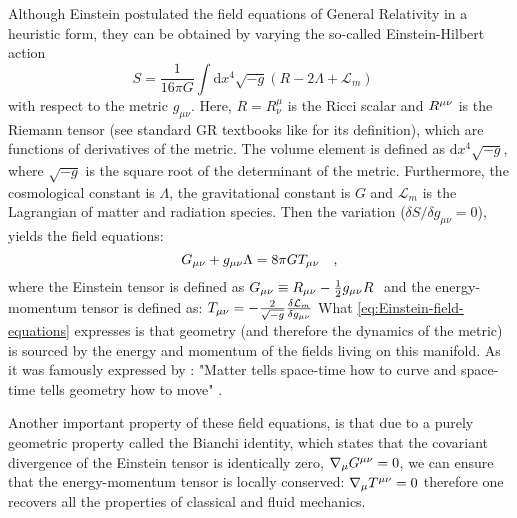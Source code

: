 Although Einstein postulated the field equations of General Relativity in a heuristic
form, they can be obtained by varying the so-called Einstein-Hilbert action
\begin{equation}\label{eq:Einstein-Hilbert action}
S = \frac{1}{16 \pi G} \int \textrm{d}x^4 \sqrt{-g}\left( R - 2\Lambda + \mathcal{L}_m \right) \quad 
\end{equation}
with respect to the metric $g_{\mu \nu}$.
Here, $R=R^\mu_\nu$ is the Ricci scalar and $R^{\mu \nu}$ is the Riemann tensor (see standard GR textbooks like \cite{wald} for its definition), 
which are functions of derivatives of the metric. The volume element is defined as $\textrm{d}x^4 \sqrt{-g}$, where
$\sqrt{-g}$ is the square root of the determinant of the metric.
Furthermore, the cosmological constant is $\Lambda$, the gravitational constant is $G$ and $\mathcal{L}_m $ is the Lagrangian of matter and radiation species.
Then the variation ($\delta S / \delta g_{\mu \nu} = 0$), yields the field equations:
\begin{equation}\label{eq:Einstein-field-equations}
G_{\mu \nu} + g_{\mu \nu} \Lambda = 8 \pi G T_{\mu \nu} \quad ,
\end{equation}
where the Einstein tensor is defined as $G_{\mu \nu} \equiv R_{\mu \nu} - \frac{1}{2}g_{\mu \nu} R \;$ and the 
energy-momentum tensor is defined as:
\beeqp$
T_{\mu \nu} = -\frac{2}{\sqrt{-g}} \frac{\delta \mathcal{L}_m}{\delta g_{\mu \nu}}
$
What \cref{eq:Einstein-field-equations} expresses is that geometry (and therefore the dynamics of the metric) is sourced by 
the energy and momentum of the fields living on this manifold.
As it was famously expressed by \cite{Misner, Wheeler, Gravitation}:
"Matter tells space-time how to curve and space-time tells geometry how to move" .

Another important property of these field equations, is that due to a purely geometric property called the Bianchi identity, which
states that the covariant divergence of the Einstein tensor is identically zero, 
$\nabla_{\mu} G^{\mu \nu} = 0$, 
we can ensure that the energy-momentum tensor is locally conserved:
\beeqc$
\nabla_{\mu} T^{\mu \nu} = 0
$
therefore one recovers all the properties of classical and fluid mechanics.


